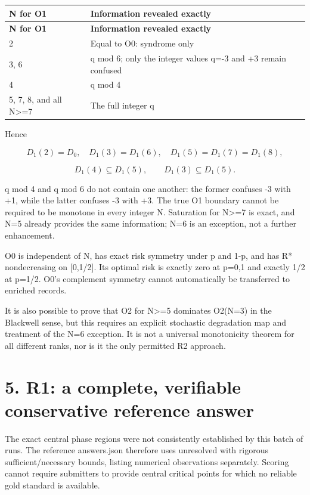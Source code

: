 \documentclass[11pt,a4paper]{article}
\begin{document}
{\fontsize{9}{12.5}\selectfont
\setlength{\tabcolsep}{2.2pt}

\begin{longtable}{>{\raggedright\arraybackslash}p{}>{\raggedright\arraybackslash}p{}}
\toprule
\textbf{N for O1} & \textbf{Information revealed exactly}\tabularnewline
\midrule
\endfirsthead
\toprule
\textbf{N for O1} & \textbf{Information revealed exactly}\tabularnewline
\midrule
\endhead
{}2 & Equal to O0: syndrome only\tabularnewline
{}3, 6 & q mod 6; only the integer values q=-3 and +3 remain confused\tabularnewline
{}4 & q mod 4\tabularnewline
{}5, 7, 8, and all N>=7 & The full integer q\tabularnewline
\bottomrule
\end{longtable}
}

Hence

\[
D_1(2)=D_0,\quad D_1(3)=D_1(6),\quad
D_1(5)=D_1(7)=D_1(8),
\]

\[
D_1(4)\subseteq D_1(5),\qquad
D_1(3)\subseteq D_1(5).
\]

q mod 4 and q mod 6 do not contain one another: the former confuses -3 with +1, while the latter confuses -3 with +3. The true O1 boundary cannot be required to be monotone in every integer N. Saturation for N>=7 is exact, and N=5 already provides the same information; N=6 is an exception, not a further enhancement.

O0 is independent of N, has exact risk symmetry under p and 1-p, and has R* nondecreasing on [0,1/\allowbreak{}2]. Its optimal risk is exactly zero at p=0,1 and exactly 1/\allowbreak{}2 at p=1/\allowbreak{}2. O0's complement symmetry cannot automatically be transferred to enriched records.

It is also possible to prove that O2 for N>=5 dominates O2(N=3) in the Blackwell sense, but this requires an explicit stochastic degradation map and treatment of the N=6 exception. It is not a universal monotonicity theorem for all different ranks, nor is it the only permitted R2 approach.

\section*{5. R1: a complete, verifiable conservative reference answer}

The exact central phase regions were not consistently established by this batch of runs. The reference answers.json therefore uses unresolved with rigorous sufficient/\allowbreak{}necessary bounds, listing numerical observations separately. Scoring cannot require submitters to provide central critical points for which no reliable gold standard is available.
\end{document}
